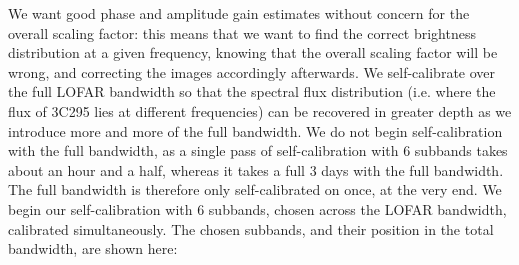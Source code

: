 \pg
We want good phase and amplitude gain estimates without concern for the overall scaling factor: this means that we want to find the correct brightness distribution at a given frequency, knowing that the overall scaling factor will be wrong, and correcting the images accordingly afterwards. We self-calibrate over the full LOFAR bandwidth so that the spectral flux distribution (i.e. where the flux of 3C295 lies at different frequencies) can be recovered in greater depth as we introduce more and more of the full bandwidth. We do not begin self-calibration with the full bandwidth, as a single pass of self-calibration with 6 subbands takes about an hour and a half, whereas it takes a full 3 days with the full bandwidth. The full bandwidth is therefore only self-calibrated on once, at the very end. We begin our self-calibration with 6 subbands, chosen across the LOFAR bandwidth, calibrated simultaneously. The chosen subbands, and their position in the total bandwidth, are shown here:
\begin{figure}[h]
\begin{floatrow}
\end{floatrow}
\end{figure}

